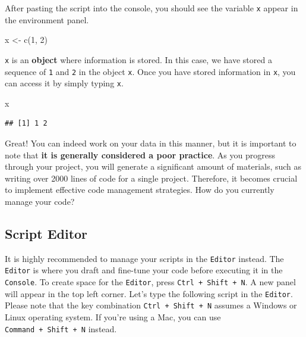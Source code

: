 \documentclass[
]{book}
\newenvironment{Shaded}{\begin{snugshade}}{\end{snugshade}}
\newcommand{\DecValTok}[1]{\textcolor[rgb]{0.00,0.00,0.81}{#1}}
\newcommand{\FunctionTok}[1]{\textcolor[rgb]{0.00,0.00,0.00}{#1}}
\newcommand{\NormalTok}[1]{#1}
\newcommand{\OtherTok}[1]{\textcolor[rgb]{0.56,0.35,0.01}{#1}}
\begin{document}
After pasting the script into the console, you should see the variable \texttt{x} appear in the environment panel.

\begin{Shaded}
\begin{Highlighting}[]
\NormalTok{x }\OtherTok{\textless{}{-}} \FunctionTok{c}\NormalTok{(}\DecValTok{1}\NormalTok{, }\DecValTok{2}\NormalTok{)}
\end{Highlighting}
\end{Shaded}

\texttt{x} is an \textbf{object} where information is stored. In this case, we have stored a sequence of \texttt{1} and \texttt{2} in the object \texttt{x}. Once you have stored information in \texttt{x}, you can access it by simply typing \texttt{x}.

\begin{Shaded}
\begin{Highlighting}[]
\NormalTok{x}
\end{Highlighting}
\end{Shaded}

\begin{verbatim}
## [1] 1 2
\end{verbatim}

Great! You can indeed work on your data in this manner, but it is important to note that \textbf{it is generally considered a poor practice}. As you progress through your project, you will generate a significant amount of materials, such as writing over 2000 lines of code for a single project. Therefore, it becomes crucial to implement effective code management strategies. How do you currently manage your code?

\hypertarget{script-editor}{%
\subsection{Script Editor}\label{script-editor}}

It is highly recommended to manage your scripts in the \texttt{Editor} instead. The \texttt{Editor} is where you draft and fine-tune your code before executing it in the \texttt{Console}. To create space for the \texttt{Editor}, press \texttt{Ctrl\ +\ Shift\ +\ N}. A new panel will appear in the top left corner. Let's type the following script in the \texttt{Editor}. Please note that the key combination \texttt{Ctrl\ +\ Shift\ +\ N} assumes a Windows or Linux operating system. If you're using a Mac, you can use \texttt{Command\ +\ Shift\ +\ N} instead.
\end{document}
